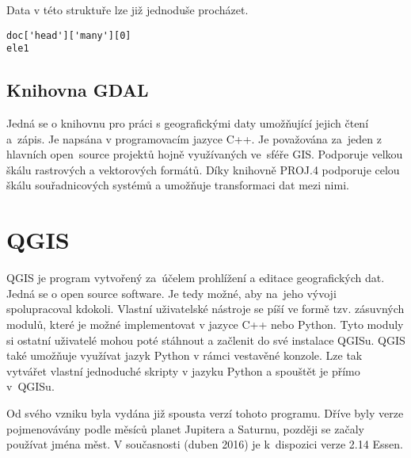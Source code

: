 Data v této struktuře lze již jednoduše procházet.

{\scriptsize
\lstset{language=Python}
\begin{lstlisting}
doc['head']['many'][0]
ele1
\end{lstlisting}
}

\subsection{Knihovna GDAL} %
\label{GDAL/OGR}
Jedná se o knihovnu pro práci s geografickými daty umožňující jejich
čtení a~zápis. Je napsána v programovacím jazyce C++. Je považována
za~jeden z hlavních open~source projektů hojně využívaných ve~sféře
GIS. Podporuje velkou škálu rastrových a vektorových formátů.
Díky knihovně PROJ.4 podporuje celou škálu souřadnicových systémů a umožňuje transformaci dat mezi nimi. \cite{GDAL}

\section{QGIS}
\label{QGIS}
QGIS je program vytvořený za~účelem prohlížení a editace geografických
dat. Jedná se o open source software. Je tedy možné, aby na~jeho vývoji
spolupracoval kdokoli. Vlastní uživatelské nástroje se píší ve formě tzv. zásuvných modulů, které je možné implementovat v jazyce C++ nebo Python.
Tyto moduly si ostatní uživatelé mohou poté stáhnout a začlenit do své instalace QGISu. QGIS také umožňuje využívat jazyk Python v rámci vestavěné konzole. Lze tak vytvářet vlastní jednoduché skripty v jazyku Python a spouštět
je přímo v~QGISu.

Od svého vzniku byla vydána již spousta verzí tohoto programu. Dříve byly
verze pojmenovávány podle měsíců planet Jupitera a Saturnu, později se začaly používat jména měst. V současnosti (duben 2016) je
k~dispozici verze 2.14 Essen.
